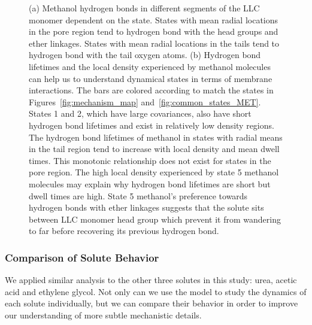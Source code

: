 \documentclass[journal=jpcbfk,manuscript=article]{achemso}
\begin{document}
\begin{figure}
  \caption{(a) Methanol hydrogen bonds in different segments of the LLC monomer
  dependent on the state. States with mean radial locations in the pore region tend to
  hydrogen bond with the head groups and ether linkages. States with mean radial
  locations in the tails tend to hydrogen bond with the tail oxygen atoms.
  (b) Hydrogen bond lifetimes and the local density experienced by methanol
  molecules can help us to understand dynamical states in terms of membrane 
  interactions. The bars are colored according to match the states in Figures~\ref{fig:mechanism_map}
  and~\ref{fig:common_states_MET}. States 1 and 2, which have large covariances, also have short
  hydrogen bond lifetimes and exist in relatively low density regions. The
  hydrogen bond lifetimes of methanol in states with radial means in the tail
  region tend to increase with local density and mean dwell times. 
  This monotonic
  relationship does not exist for states in the pore region. The high 
  local density experienced by state 5 methanol molecules may explain why 
  hydrogen bond lifetimes are short but dwell times are high. State 5 methanol's
  preference towards hydrogen bonds with ether linkages suggests that the solute
  sits between LLC monomer head group which prevent it from wandering to far
  before recovering its previous hydrogen bond.
  }\label{fig:hbond_pichart}
  \end{figure}
  
  \subsubsection*{Comparison of Solute Behavior}
  We applied similar analysis to the other three solutes in this study: urea, acetic acid
  and ethylene glycol. Not only can we use the model to study the dynamics of each 
  solute individually, but we can compare their behavior in order to improve our
  understanding of more subtle mechanistic details.
  
\end{document}
